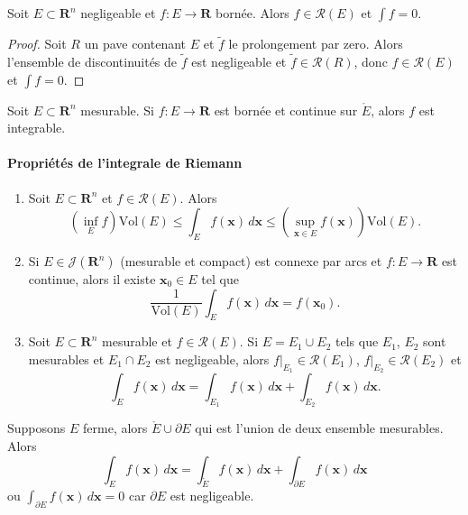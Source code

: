 \begin{corollary}
Soit $E\subset \mathbf{R}^{n}$ negligeable et $f:E\to \mathbf{R}$ bornée. Alors $f\in \mathcal{R}(E)$ et $\int f=0$. 
\end{corollary}
\begin{proof}
Soit $R$ un pave contenant $E$ et $\tilde{f}$ le prolongement par zero. Alors l'ensemble de discontinuités de $\tilde{f}$ est negligeable et $\tilde{f}\in \mathcal{R}(R)$, donc $f\in \mathcal{R}(E)$ et $\int f=0$.
\end{proof}
\begin{theorem}
Soit $E\subset \mathbf{R}^{n}$ mesurable. Si $f:E\to \mathbf{R}$ est bornée et continue sur ${\mathring{ E }}$, alors $f$ est integrable.
\end{theorem}
\paragraph{Propriétés de l'integrale de Riemann}
\begin{enumerate}
\item Soit $E\subset \mathbf{R}^{n}$ et $f\in \mathcal{R}(E)$. Alors 
$$
(\inf_{E}f)\mathrm{Vol}(E)\le \int _{E}f(\boldsymbol{x})\,d\boldsymbol{x}\le (\sup_{\boldsymbol{x}\in E}f(\boldsymbol{x}))\mathrm{Vol}(E).
$$
\item Si $E\in \mathcal{J}(\mathbf{R}^{n})$ (mesurable et compact) est connexe par arcs et $f:E\to \mathbf{R}$ est continue, alors il existe $\boldsymbol{x}_{0}\in E$ tel que
$$
\frac{1}{\mathrm{Vol}(E)}\int _{E}f(\boldsymbol{x})\,d\boldsymbol{x}=f(\boldsymbol{x}_{0}).
$$
\item Soit $E\subset \mathbf{R}^{n}$ mesurable et $f\in \mathcal{R}(E)$. Si $E=E_{1}\cup E_{2}$ tels que $E_{1}$, $E_{2}$ sont mesurables et $E_{1}\cap E_{2}$ est negligeable, alors $f|_{E_{1}}\in \mathcal{R}(E_{1})$, $f|_{E_{2}}\in \mathcal{R}(E_{2})$ et $$\int _{E}f(\boldsymbol{x})\,d\boldsymbol{x}=\int _{E_{1}}f(\boldsymbol{x})\,d\boldsymbol{x}+\int _{E_{2}}f(\boldsymbol{x})\,d\boldsymbol{x}.$$
\end{enumerate}
\begin{remark}
Supposons $E$ ferme, alors ${\mathring{ E }\cup \partial E}$ qui est l'union de deux ensemble mesurables. Alors 
$$
\int _{E}f(\boldsymbol{x})\,d\boldsymbol{x}=\int _{{\mathring{ E }}}f(\boldsymbol{x}) \, d\boldsymbol{x}+\int _{\partial E}f(\boldsymbol{x}) \, d\boldsymbol{x}  
$$
ou $\int _{\partial E}f(\boldsymbol{x}) \, d\boldsymbol{x}=0$ car $\partial E$ est negligeable.
\end{remark}

